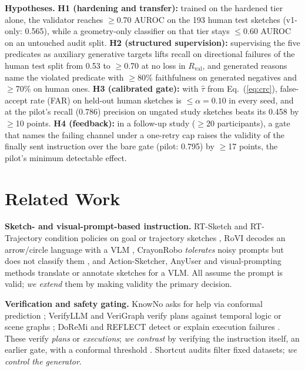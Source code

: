 \documentclass{article} %
\begin{document}
\textbf{Hypotheses.} \textbf{H1 (hardening and transfer):} trained on the hardened tier alone, the validator reaches $\ge$0.70 AUROC on the 193 human test sketches (v1-only: 0.565), while a geometry-only classifier on that tier stays $\le$0.60 AUROC on an untouched audit split. \textbf{H2 (structured supervision):} supervising the five predicates as auxiliary generative targets lifts recall on directional failures of the human test split from 0.53 to $\ge$0.70 at no loss in $R_{\mathrm{val}}$, and generated reasons name the violated predicate with $\ge$80\% faithfulness on generated negatives and $\ge$70\% on human ones. \textbf{H3 (calibrated gate):} with $\hat\tau$ from Eq.~(\ref{eq:crc}), false-accept rate (FAR) on held-out human sketches is $\le\alpha=0.10$ in every seed, and at the pilot's recall (0.786) precision on ungated study sketches beats its 0.458 by $\ge$10 points. \textbf{H4 (feedback):} in a follow-up study ($\ge$20 participants), a gate that names the failing channel under a one-retry cap raises the validity of the finally sent instruction over the bare gate (pilot: 0.795) by $\ge$17 points, the pilot's minimum detectable effect.

\section{Related Work}
\label{sec:related}

\textbf{Sketch- and visual-prompt-based instruction.} RT-Sketch and RT-Trajectory condition policies on goal or trajectory sketches \citep{sundaresan2024rtsketch,gu2024rttrajectory}, RoVI decodes an arrow/circle language with a VLM \citep{li2025rovi}, CrayonRobo \emph{tolerates} noisy prompts but does not classify them \citep{li2025crayonrobo}, and Action-Sketcher, AnyUser and visual-prompting methods \citep{tan2026actionsketcher,yang2026anyuser,nasiriany2024pivot,yang2023som,liu2024moka,yuan2024robopoint,cai2024vipllava} translate or annotate sketches for a VLM. All assume the prompt is valid; \emph{we extend} them by making validity the primary decision.

\textbf{Verification and safety gating.} KnowNo asks for help via conformal prediction \citep{ren2023knowno}; VerifyLLM and VeriGraph verify plans against temporal logic or scene graphs \citep{sautenkov2025verifyllm,ekpo2024verigraph}; DoReMi and REFLECT detect or explain execution failures \citep{guo2024doremi,liu2023reflect}. These verify \emph{plans} or \emph{executions}; \emph{we contrast} by verifying the instruction itself, an earlier gate, with a conformal threshold \citep{angelopoulos2024conformalrisk,geifman2017selective}. Shortcut audits \citep{gururangan2018artifacts,geirhos2020shortcut,swayamdipta2020cartography} filter fixed datasets; \emph{we control the generator}.
\end{document}
